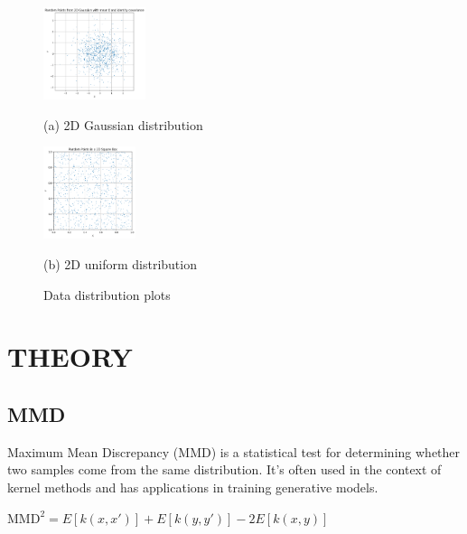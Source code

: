 \documentclass{article}
\begin{document}
\begin{figure}[htb]
  \begin{minipage}[a]{.48\linewidth}
    \centering
    \centerline{\includegraphics[width=3.0cm]{images/gaussian2d}}
    \centerline{(a) 2D Gaussian distribution}\medskip
  \end{minipage}
  \hfill
  \begin{minipage}[c]{0.48\linewidth}
    \centering
    \centerline{\includegraphics[width=2.7cm]{images/uniform2d}}
    \centerline{(b) 2D uniform distribution}\medskip
  \end{minipage}
  \caption{Data distribution plots}
  \label{fig:res}
  \end{figure}
  

\section{THEORY}
\label{sec:theory}

\subsection{MMD}
\label{ssec:mmd}

Maximum Mean Discrepancy (MMD) is a statistical test for determining whether two samples come from the same distribution. It's often used in the context of kernel methods and has applications in training generative models.

$ \text{MMD}^2 = E[k(x, x')] + E[k(y, y')] - 2E[k(x, y)] $
\end{document}
